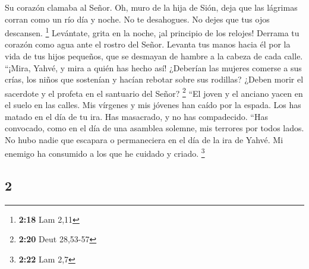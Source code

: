 \begin{paracol}{2}
 Su corazón clamaba al Señor. Oh, muro de la hija de
Sión, deja que las lágrimas corran como un río día y noche. No te
desahogues. No dejes que tus ojos descansen. \footnote{\textbf{2:18} Lam
  2,11}  Levántate, grita en la noche, ¡al principio de
los relojes! Derrama tu corazón como agua ante el rostro del Señor.
Levanta tus manos hacia él por la vida de tus hijos pequeños, que se
desmayan de hambre a la cabeza de cada calle.  ``¡Mira,
Yahvé, y mira a quién has hecho así! ¿Deberían las mujeres comerse a sus
crías, los niños que sostenían y hacían rebotar sobre sus rodillas?
¿Deben morir el sacerdote y el profeta en el santuario del Señor?
\footnote{\textbf{2:20} Deut 28,53-57}  ``El joven y el
anciano yacen en el suelo en las calles. Mis vírgenes y mis jóvenes han
caído por la espada. Los has matado en el día de tu ira. Has masacrado,
y no has compadecido.  ``Has convocado, como en el día de
una asamblea solemne, mis terrores por todos lados. No hubo nadie que
escapara o permaneciera en el día de la ira de Yahvé. Mi enemigo ha
consumido a los que he cuidado y criado. \footnote{\textbf{2:22} Lam 2,7}

\switchcolumn
\begin{otherlanguage}{english}

\hypertarget{section-3}{%
\section{2}\label{section-3}}


\end{otherlanguage}
\end{paracol}
